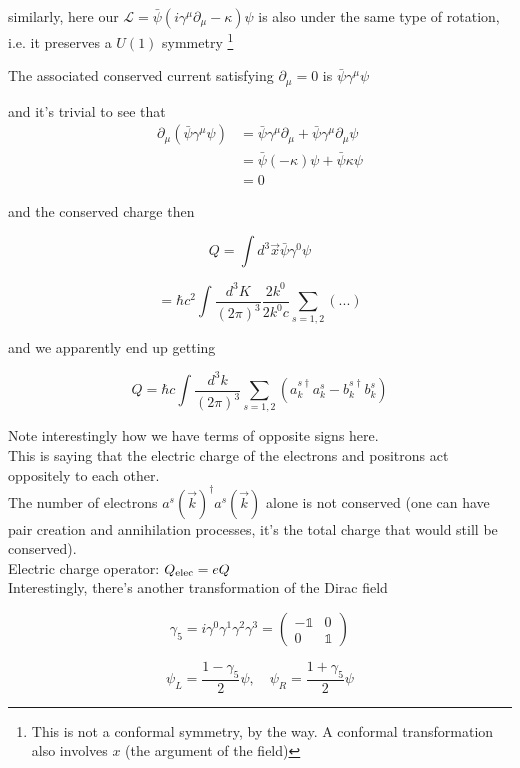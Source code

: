\documentclass[11pt]{article}
\newcommand{\lag}{\mathcal{L}}
\begin{document}
	
	similarly, here our $\lag = \bar{\psi}(i\gamma^\mu \partial_\mu - \kappa)\psi$ is also under the same type of rotation, i.e. it preserves a $U(1)$ symmetry \footnote{This is not a conformal symmetry, by the way. A conformal transformation also involves $x$ (the argument of the field)}
	
	The associated conserved current satisfying $\partial_\mu = 0$ is $\bar{\psi}\gamma^\mu \psi$
	
	and it's trivial to see that  \begin{align*}
		\partial_\mu (\bar{\psi}\gamma^\mu \psi) & = \bar{\psi}\gamma^\mu \partial_\mu + \bar{\psi}\gamma^\mu\partial_\mu \psi\\
		& =\bar{\psi}(-\kappa)\psi + \bar{\psi}\kappa \psi\\
		& =0
	\end{align*}

	and the conserved charge then
	
	\[ Q = \int d^3 \vec{x} \bar{\psi}\gamma^0\psi\]
	
			\[ = \hbar c^2 \int \frac{d^3 K}{(2\pi)^3}\frac{2k^0}{2k^0 c} \sum_{s=1,2}( ... )\]
	
	
	and we apparently end up getting
	
	\[ Q = \hbar c \int \frac{d^3 k}{(2\pi)^3} \sum_{s=1,2}(a^{s\dagger}_k a^s_k - b^{s\dagger}_k b^s_k)\]
	
	Note interestingly how we have terms of opposite signs here.\\
	
	This is saying that the electric charge of the electrons and positrons act oppositely to each other.\\
	
	The number of electrons $a^{s}(\vec{k})^\dagger a^s(\vec{k})$ alone is not conserved (one can have pair creation and annihilation processes, it's the total charge that would still be conserved).\\
	
	Electric charge operator: $Q_{\rm{elec}} = eQ$\\
	
	Interestingly, there's another transformation of the Dirac field
	
	\[ \gamma_5 = i\gamma^0 \gamma^1 \gamma^2\gamma^3 = \begin{pmatrix}
		-\mathbb{1} & 0 \\ 0 & \mathbb{1}
	\end{pmatrix}\]
	
	\[ \psi_L = \frac{1-\gamma_5}{2}\psi, \quad \psi_R = \frac{1+\gamma_5}{2}\psi \]
	  
\end{document}
